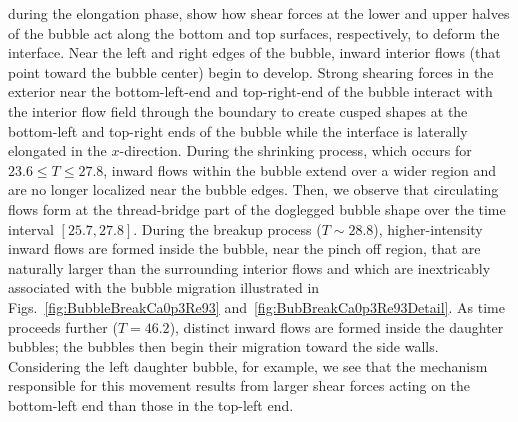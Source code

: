 \documentclass[%
 reprint,
 showkeys,
 amsmath,amssymb,
 aps,
 prfluids,
 onecolumn
]{revtex4-2}
\begin{document}
during the elongation phase, show how shear forces at the lower and upper
halves of the bubble act along the bottom and top surfaces, respectively, to
deform the interface.  Near the left and right edges of the bubble, inward
interior flows (that point toward the bubble center) begin to develop.  Strong
shearing forces in the exterior near the bottom-left-end and top-right-end of
the bubble interact with the interior flow field through the boundary to create
cusped shapes at the bottom-left and top-right ends of the bubble while the
interface is laterally elongated in the $x$-direction.  During the shrinking
process, which occurs for $23.6 \leq T \leq 27.8$, inward flows within the
bubble extend over a wider region and are no longer localized near the bubble
edges.  Then, we observe that circulating flows form at the thread-bridge part
of the doglegged bubble shape over the time interval $[25.7, 27.8]$.  During
the breakup process ($T \sim 28.8$), higher-intensity inward flows are formed
inside the bubble, near the pinch off region, that are naturally larger than
the surrounding interior flows and which are inextricably associated with the
bubble migration illustrated in Figs.~\ref{fig:BubbleBreakCa0p3Re93}
and~\ref{fig:BubBreakCa0p3Re93Detail}.  As time proceeds further ($T =  46.2$),
distinct inward flows are formed inside the daughter bubbles; the bubbles then
begin their migration toward the side walls.  Considering the left daughter
bubble, for example, we see that the mechanism responsible for this movement
results from larger shear forces acting on the bottom-left end than those in
the top-left end.
\end{document}
